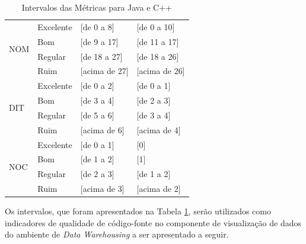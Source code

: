 \begin{table}[!ht]
\begin{center}
\begin{tabular}{ |l|l|l|l| }
		\multirow{4}{*}{NOM} 
		 & Excelente & [de 0 a 8] & [de 0 a 10] \\
		 & Bom & [de 9 a 17] & [de 11 a 17] \\
		 & Regular & [de 18 a 27] & [de 18 a 26] \\
		 & Ruim & [acima de 27] & [acima de 26] \\ \hline
		 
		\multirow{4}{*}{DIT} 
		 & Excelente & [de 0 a 2] & [de 0 a 1] \\
		 & Bom & [de 3 a 4] & [de 2 a 3] \\
		 & Regular & [de 5 a 6] & [de 3 a 4] \\
		 &
		  Ruim & [acima de 6] & [acima de 4] \\ \hline
		
		\multirow{4}{*}{NOC} 
		 & Excelente & [de 0 a 1] & [0] \\
		 & Bom & [de 1 a 2] & [1] \\
		 & Regular & [de 2 a 3] & [de 1 a 2] \\
		 & Ruim & [acima de 3] & [acima de 2] \\ \hline
		 
	\end{tabular}
	\caption{Intervalos das Métricas para Java e C++}
	\label{metrics}
	\end{center}
	\end{table}

\FloatBarrier
	
Os intervalos, que foram apresentados na Tabela \ref{metrics}, serão utilizados
como indicadores de qualidade de código-fonte no componente de visualização de dados do ambiente de \textit{Data Warehousing} a ser apresentado a seguir.